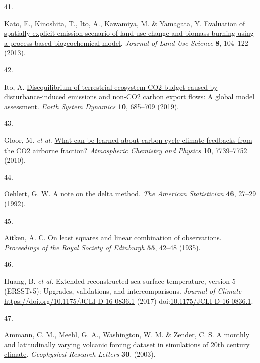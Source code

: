 \documentclass[
  12pt,
  letterpaper,
  DIV=11,
  numbers=noendperiod]{scrartcl}
\newlength{\cslhangindent}
\newlength{\csllabelwidth}
\newenvironment{CSLReferences}[2] %
 {\begin{list}{}{%
  \setlength{\itemindent}{0pt}
  \setlength{\leftmargin}{0pt}
  \setlength{\parsep}{0pt}
  \ifodd #1
   \setlength{\leftmargin}{\cslhangindent}
   \setlength{\itemindent}{-1\cslhangindent}
  \fi
  \setlength{\itemsep}{#2\baselineskip}}}
 {\end{list}}
\newcommand{\CSLLeftMargin}[1]{\parbox[t]{\csllabelwidth}{\strut#1\strut}}
\newcommand{\CSLRightInline}[1]{\parbox[t]{\linewidth - \csllabelwidth}{\strut#1\strut}}
\begin{document}
\begin{CSLReferences}{0}{0}
\CSLLeftMargin{41. }%
\CSLRightInline{Kato, E., Kinoshita, T., Ito, A., Kawamiya, M. \&
Yamagata, Y.
\href{https://doi.org/10.1080/1747423X.2011.628705}{Evaluation of
spatially explicit emission scenario of land-use change and biomass
burning using a process-based biogeochemical model}. \emph{Journal of
Land Use Science} \textbf{8}, 104--122 (2013).}

\CSLLeftMargin{42. }%
\CSLRightInline{Ito, A.
\href{https://doi.org/10.5194/esd-10-685-2019}{Disequilibrium of
terrestrial ecosystem CO2 budget caused by disturbance-induced emissions
and non-CO2 carbon export flows: A global model assessment}. \emph{Earth
System Dynamics} \textbf{10}, 685--709 (2019).}

\CSLLeftMargin{43. }%
\CSLRightInline{{Gloor, M. \emph{et al.}}
\href{https://acp.copernicus.org/articles/10/7739/2010/}{What can be
learned about carbon cycle climate feedbacks from the CO2 airborne
fraction?} \emph{Atmospheric Chemistry and Physics} \textbf{10},
7739--7752 (2010).}

\CSLLeftMargin{44. }%
\CSLRightInline{Oehlert, G. W.
\href{https://doi.org/10.1080/00031305.1992.10475842}{A note on the
delta method}. \emph{The American Statistician} \textbf{46}, 27--29
(1992).}

\CSLLeftMargin{45. }%
\CSLRightInline{Aitken, A. C.
\href{https://doi.org/10.1017/S0370164600014346}{On least squares and
linear combination of observations}. \emph{Proceedings of the Royal
Society of Edinburgh} \textbf{55}, 42--48 (1935).}

\CSLLeftMargin{46. }%
\CSLRightInline{Huang, B. \emph{et al.} Extended reconstructed sea
surface temperature, version 5 (ERSSTv5): Upgrades, validations, and
intercomparisons. \emph{Journal of Climate}
\url{https://doi.org/10.1175/JCLI-D-16-0836.1} (2017)
doi:\href{https://doi.org/10.1175/JCLI-D-16-0836.1}{10.1175/JCLI-D-16-0836.1}.}

\CSLLeftMargin{47. }%
\CSLRightInline{Ammann, C. M., Meehl, G. A., Washington, W. M. \&
Zender, C. S. \href{https://doi.org/10.1029/2003GL016875}{A monthly and
latitudinally varying volcanic forcing dataset in simulations of 20th
century climate}. \emph{Geophysical Research Letters} \textbf{30},
(2003).}

\end{CSLReferences}
\end{document}
